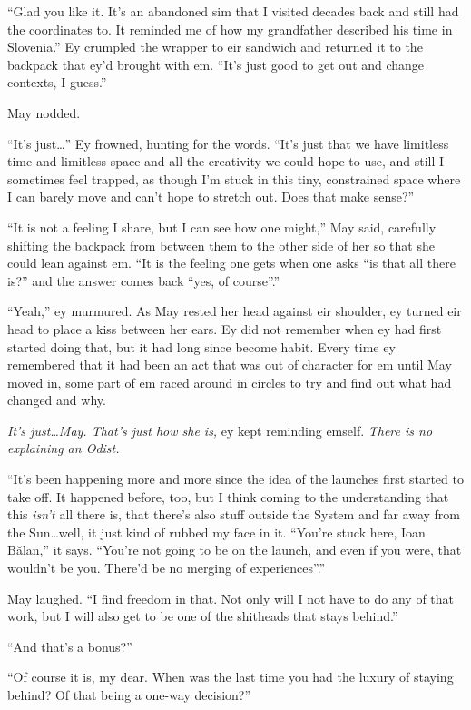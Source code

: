``Glad you like it. It's an abandoned sim that I visited decades back and still had the coordinates to. It reminded me of how my grandfather described his time in Slovenia.'' Ey crumpled the wrapper to eir sandwich and returned it to the backpack that ey'd brought with em. ``It's just good to get out and change contexts, I guess.''

May nodded.

``It's just\ldots{}'' Ey frowned, hunting for the words. ``It's just that we have limitless time and limitless space and all the creativity we could hope to use, and still I sometimes feel trapped, as though I'm stuck in this tiny, constrained space where I can barely move and can't hope to stretch out. Does that make sense?''

``It is not a feeling I share, but I can see how one might,'' May said, carefully shifting the backpack from between them to the other side of her so that she could lean against em. ``It is the feeling one gets when one asks ``is that all there is?'' and the answer comes back ``yes, of course''.''

``Yeah,'' ey murmured. As May rested her head against eir shoulder, ey turned eir head to place a kiss between her ears. Ey did not remember when ey had first started doing that, but it had long since become habit. Every time ey remembered that it had been an act that was out of character for em until May moved in, some part of em raced around in circles to try and find out what had changed and why.

\emph{It's just\ldots May. That's just how she is,} ey kept reminding emself. \emph{There is no explaining an Odist.}

``It's been happening more and more since the idea of the launches first started to take off. It happened before, too, but I think coming to the understanding that this \emph{isn't} all there is, that there's also stuff outside the System and far away from the Sun\ldots well, it just kind of rubbed my face in it. ``You're stuck here, Ioan Bălan,'' it says. ``You're not going to be on the launch, and even if you were, that wouldn't be you. There'd be no merging of experiences''.''

May laughed. ``I find freedom in that. Not only will I not have to do any of that work, but I will also get to be one of the shitheads that stays behind.''

``And that's a bonus?''

``Of course it is, my dear. When was the last time you had the luxury of staying behind? Of that being a one-way decision?''

